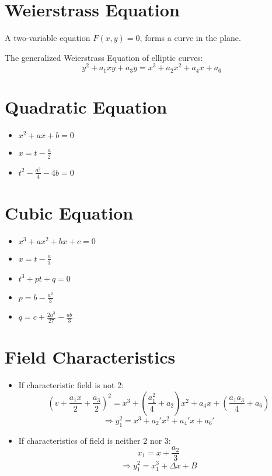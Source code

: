 \section*{Weierstrass Equation}

A two-variable equation \( F(x,y) = 0 \), forms a curve in the plane.

The generalized Weierstrass Equation of elliptic curves:
\[ y^2 + a_1xy + a_3y = x^3 + a_2x^2 + a_4x + a_6 \]

\section*{Quadratic Equation}

\begin{itemize}
	\item \( x^2 + ax + b = 0 \)
	\item \( x = t - \frac{a}{2} \)
	\item \( t^2 - \frac{a^2}{4} - 4b = 0 \)
\end{itemize}

\section*{Cubic Equation}

\begin{itemize}
	\item \( x^3 + ax^2 + bx + c = 0 \)
	\item \( x = t - \frac{a}{3} \)
	\item \( t^3 + pt + q = 0 \)
	\item \( p = b - \frac{a^2}{3} \)
	\item \( q = c + \frac{2a^3}{27} - \frac{ab}{3} \)
\end{itemize}

\section*{Field Characteristics}

\begin{itemize}
	\item If characteristic field is not 2:
	\begin{equation*}
		\left(v + \frac{a_1x}{2} + \frac{a_3}{2}\right)^2 = x^3 + \left(\frac{a_1^2}{4} + a_2\right)x^2 + a_4x + \left(\frac{a_1a_3}{4} + a_6\right)
	\end{equation*}
	\begin{equation*}
		\Rightarrow y_1^2 = x^3 + a_2'x^2 + a_4'x + a_6'
	\end{equation*}
	
	\item If characteristics of field is neither 2 nor 3:
	\begin{equation*}
		x_1 = x + \frac{a_2}{3}
	\end{equation*}
	\begin{equation*}
		\Rightarrow y_1^2 = x_1^3 + \Delta x + B
	\end{equation*}
\end{itemize}

